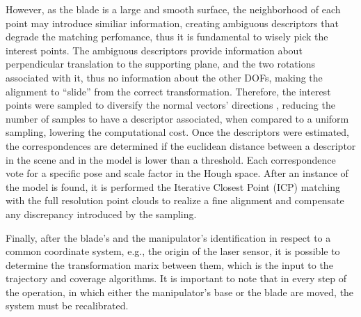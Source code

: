 However, as the blade is a large and smooth surface, the neighborhood of each
point may introduce similiar information, creating ambiguous descriptors that
degrade the matching perfomance, thus it is fundamental to wisely pick the
interest points.
The ambiguous descriptors provide information about perpendicular translation to
the supporting plane, and the two rotations associated with it, thus no
information about the other DOFs, making the alignment to ``slide'' from the
correct transformation. Therefore, the interest points were sampled to diversify
the normal vectors' directions \cite{Rusinkiewicz2001}, reducing the number of
samples to have a descriptor associated, when compared to a uniform sampling,
lowering the computational cost. Once the descriptors were estimated, the
correspondences are determined if the euclidean distance between a descriptor in
the scene and in the model is lower than a threshold. Each correspondence vote
for a specific pose and scale factor in the Hough space. After an instance of
the model is found, it is performed the Iterative Closest Point (ICP) matching
with the full resolution point clouds to realize a fine alignment and compensate
any discrepancy introduced by the sampling. 

Finally, after the blade's and the
manipulator's identification in respect to a common coordinate system, e.g., the
origin of the laser sensor, it is possible to determine the transformation marix
between them, which is the input to the trajectory and coverage algorithms. It
is important to note that in every step of the operation, in which either the
manipulator's base or the blade are moved, the system must be recalibrated.



